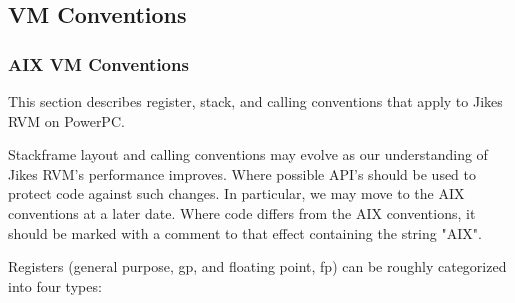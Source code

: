 \JikesTMFooter

\subsection{VM Conventions}

\subsubsection{AIX\TMheadingweb{} VM Conventions}
\label{aix-conventions}


This section describes register, stack, and calling conventions that apply to 
Jikes RVM on PowerPC\TMweb.

Stackframe layout and calling conventions may evolve as our understanding
of Jikes RVM's performance improves.  Where possible API's should be used
to protect code against such changes.  In particular, we may move to
the AIX conventions at a later date.  Where code differs from the AIX
conventions, it should be marked with a comment to that effect containing
the string "AIX".


Registers (general purpose, gp, and floating point, fp) can be roughly
categorized into four types:

